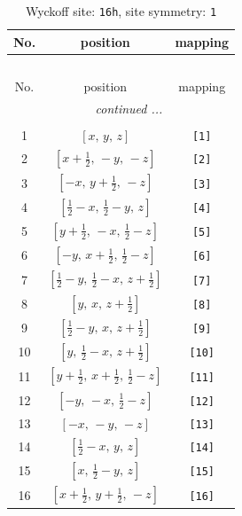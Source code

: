 \documentclass[fleqn,8pt]{jsarticle}
\begin{document}
\begin{longtable}{ccc}
\caption{Wyckoff site: {\tt 16h}, site symmetry: {\tt 1}}
 \\
 \hline \hline
No. & position & mapping \\ \hline \endfirsthead

\multicolumn{2}{l}{\tablename\ \thetable{}} \\
 \hline \hline
No. & position & mapping \\ \hline \endhead

 \hline \hline
\multicolumn{2}{r}{\footnotesize\it continued ...} \\ \endfoot

 \hline \hline
\multicolumn{2}{r}{} \\ \endlastfoot

1 & $\left[ x,\, y,\, z \right]$ & {\tt [1]} \\ \hline
2 & $\left[ x + \frac{1}{2},\, - y,\, - z \right]$ & {\tt [2]} \\ \hline
3 & $\left[ - x,\, y + \frac{1}{2},\, - z \right]$ & {\tt [3]} \\ \hline
4 & $\left[ \frac{1}{2} - x,\, \frac{1}{2} - y,\, z \right]$ & {\tt [4]} \\ \hline
5 & $\left[ y + \frac{1}{2},\, - x,\, \frac{1}{2} - z \right]$ & {\tt [5]} \\ \hline
6 & $\left[ - y,\, x + \frac{1}{2},\, \frac{1}{2} - z \right]$ & {\tt [6]} \\ \hline
7 & $\left[ \frac{1}{2} - y,\, \frac{1}{2} - x,\, z + \frac{1}{2} \right]$ & {\tt [7]} \\ \hline
8 & $\left[ y,\, x,\, z + \frac{1}{2} \right]$ & {\tt [8]} \\ \hline
9 & $\left[ \frac{1}{2} - y,\, x,\, z + \frac{1}{2} \right]$ & {\tt [9]} \\ \hline
10 & $\left[ y,\, \frac{1}{2} - x,\, z + \frac{1}{2} \right]$ & {\tt [10]} \\ \hline
11 & $\left[ y + \frac{1}{2},\, x + \frac{1}{2},\, \frac{1}{2} - z \right]$ & {\tt [11]} \\ \hline
12 & $\left[ - y,\, - x,\, \frac{1}{2} - z \right]$ & {\tt [12]} \\ \hline
13 & $\left[ - x,\, - y,\, - z \right]$ & {\tt [13]} \\ \hline
14 & $\left[ \frac{1}{2} - x,\, y,\, z \right]$ & {\tt [14]} \\ \hline
15 & $\left[ x,\, \frac{1}{2} - y,\, z \right]$ & {\tt [15]} \\ \hline
16 & $\left[ x + \frac{1}{2},\, y + \frac{1}{2},\, - z \right]$ & {\tt [16]} \\
\end{longtable}
\end{document}
